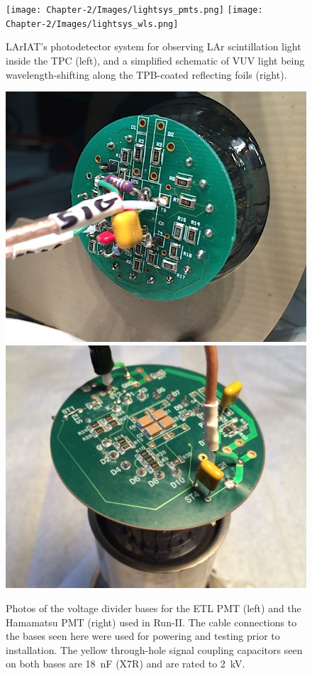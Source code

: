 \begin{figure}
\centering
\texttt{[image: Chapter-2/Images/lightsys\_pmts.png]}
\hspace{1cm}
\texttt{[image: Chapter-2/Images/lightsys\_wls.png]}
\caption{LArIAT's photodetector system for observing LAr scintillation light inside the TPC (left), and a simplified schematic of VUV light being wavelength-shifting along the TPB-coated reflecting foils (right).}
\label{lightsys_pmts}
\end{figure}
\begin{figure}
\centering
\includegraphics[height=0.25\textheight]{Chapter-2/Images/lightsys_etlbase.jpeg}
\hspace{0.5cm}
\includegraphics[height=0.25\textheight]{Chapter-2/Images/lightsys_hmmbase.jpg}
\caption{\label{voltagedividers}Photos of the voltage divider bases for the ETL PMT (left) and the Hamamatsu PMT (right) used in Run-II.  The cable connections to the bases seen here were used for powering and testing prior to installation.  The yellow through-hole signal coupling capacitors seen on both bases are 18~nF (X7R) and are rated to 2~kV.}
\end{figure}
